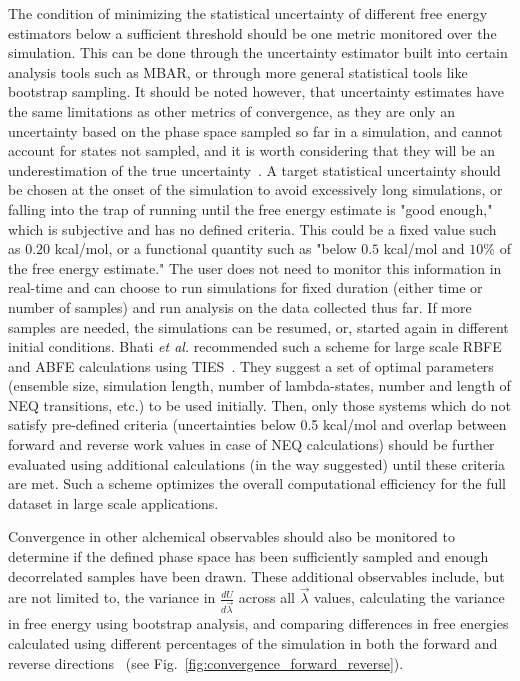\documentclass[9pt,bestpractices]{livecoms}
\begin{document}
The condition of minimizing the statistical uncertainty of different free energy estimators below a sufficient threshold should be one metric monitored over the simulation. This can be done through the uncertainty estimator built into certain analysis tools such as MBAR, or through more general statistical tools like bootstrap sampling. It should be noted however, that uncertainty estimates have the same limitations as other metrics of convergence, as they are only an uncertainty based on the phase space sampled so far in a simulation, and cannot account for states not sampled, and it is worth considering that they will be an underestimation of the true uncertainty~\cite{wan2020fep+, wan2021uq, vassaux2021, gapsys2020large, wade2022, bhati2017, bhati2022, bhati2025, wan2023eqvsneq, bhati2018, bhati2019}.
A target statistical uncertainty should be chosen at the onset of the simulation to avoid excessively long simulations, or falling into the trap of running until the free energy estimate is "good enough," which is subjective and has no defined criteria. This could be a fixed value such as $0.20$ kcal/mol, or a functional quantity such as "below $0.5$ kcal/mol and $10\%$ of the free energy estimate." The user does not need to monitor this information in real-time and can choose to run simulations for fixed duration (either time or number of samples) and run analysis on the data collected thus far. If more samples are needed, the simulations can be resumed, or, started again in different initial conditions.
Bhati \textit{et al.} recommended such a scheme for large scale RBFE and ABFE calculations using TIES~\cite{bhati2022, bhati2025, wan2023eqvsneq, coveney2022corners}. They suggest a set of optimal parameters (ensemble size, simulation length, number of lambda-states, number and length of NEQ transitions, etc.) to be used initially. Then, only those systems which do not satisfy pre-defined criteria (uncertainties below 0.5 kcal/mol and overlap between forward and reverse work values in case of NEQ calculations) should be further evaluated using additional calculations (in the way suggested) until these criteria are met. Such a scheme optimizes the overall computational efficiency for the full dataset in large scale applications.

Convergence in other alchemical observables should also be monitored to determine if the defined phase space has been sufficiently sampled and enough decorrelated samples have been drawn. These additional observables include, but are not limited to, the variance in $\frac{dU}{d\vec{\lambda}}$ across all $\vec{\lambda}$ values, calculating the variance in free energy using bootstrap analysis, and comparing differences in free energies calculated using different percentages of the simulation in both the forward and reverse directions~\cite{klimovich2015guidelines} (see Fig.~\ref{fig:convergence_forward_reverse}).
\end{document}
